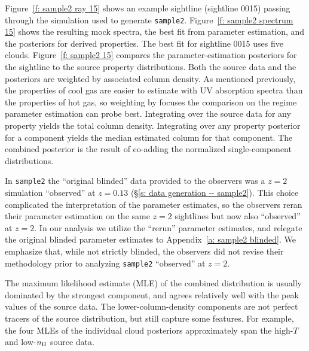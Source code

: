 \documentclass[fleqn,usenatbib]{mnras}
\begin{document}
Figure~\ref{f: sample2 ray 15} shows an example sightline (sightline 0015) passing through the simulation used to generate \texttt{sample2}.
Figure~\ref{f: sample2 spectrum 15} shows the resulting mock spectra,
the best fit from parameter estimation,
and the posteriors for derived properties.
The best fit for sightline 0015 uses five clouds.
Figure~\ref{f: sample2 15} compares the parameter-estimation posteriors for the sightline to the source property distributions.
Both the source data and the posteriors are weighted by associated  column density.
As mentioned previously, the properties of cool gas are easier to estimate with UV absorption spectra than the properties of hot gas,
so weighting by  focuses the comparison on the regime parameter estimation can probe best.
Integrating over the source data for any property yields the total  column density.
Integrating over any property posterior for a component yields the median estimated  column for that component.
The combined posterior is the result of co-adding the normalized single-component distributions.

In \texttt{sample2} the ``original blinded'' data provided to the observers was a $z=2$ simulation ``observed'' at $z=0.13$ (\S\ref{s: data generation -- sample2}).
This choice complicated the interpretation of the parameter estimates,
so the observers reran their parameter estimation on the same $z=2$ sightlines but now also ``observed'' at $z=2$.
In our analysis we utilize the ``rerun'' parameter estimates,
and relegate the original blinded parameter estimates to Appendix~\ref{a: sample2 blinded}.
We emphasize that, while not strictly blinded, the observers did not revise their methodology prior to analyzing \texttt{sample2} ``observed'' at $z=2$.

The maximum likelihood estimate (MLE) of the combined distribution is usually dominated by the strongest component,
and agrees relatively well with the peak values of the source data.
The lower-column-density components are not perfect tracers of the source distribution, but still capture some features.
For example, the four MLEs of the individual cloud posteriors approximately span the high-$T$ and low-$n_{\rm H}$ source data.
\end{document}
